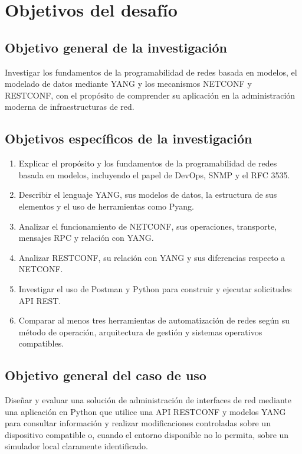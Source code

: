 \tableofcontents
\newpage

\section{Objetivos del desafío}

\subsection{Objetivo general de la investigación}
Investigar los fundamentos de la programabilidad de redes basada en modelos, el modelado de datos mediante YANG y los mecanismos NETCONF y RESTCONF, con el propósito de comprender su aplicación en la administración moderna de infraestructuras de red.

\subsection{Objetivos específicos de la investigación}
\begin{enumerate}[label=\arabic*.]
  \item Explicar el propósito y los fundamentos de la programabilidad de redes basada en modelos, incluyendo el papel de DevOps, SNMP y el RFC 3535.
  \item Describir el lenguaje YANG, sus modelos de datos, la estructura de sus elementos y el uso de herramientas como Pyang.
  \item Analizar el funcionamiento de NETCONF, sus operaciones, transporte, mensajes RPC y relación con YANG.
  \item Analizar RESTCONF, su relación con YANG y sus diferencias respecto a NETCONF.
  \item Investigar el uso de Postman y Python para construir y ejecutar solicitudes API REST.
  \item Comparar al menos tres herramientas de automatización de redes según su método de operación, arquitectura de gestión y sistemas operativos compatibles.
\end{enumerate}

\subsection{Objetivo general del caso de uso}
Diseñar y evaluar una solución de administración de interfaces de red mediante una aplicación en Python que utilice una API RESTCONF y modelos YANG para consultar información y realizar modificaciones controladas sobre un dispositivo compatible o, cuando el entorno disponible no lo permita, sobre un simulador local claramente identificado.

